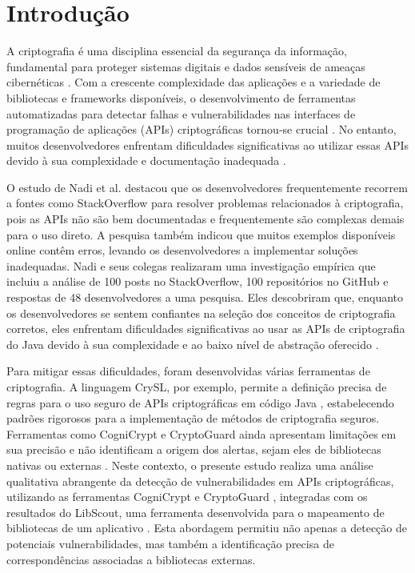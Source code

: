 \section{Introdução}

A criptografia é uma disciplina essencial da segurança da informação, fundamental para proteger sistemas digitais e dados sensíveis de ameaças cibernéticas \cite{what_is_cryptography}. Com a crescente complexidade das aplicações e a variedade de bibliotecas e frameworks disponíveis, o desenvolvimento de ferramentas automatizadas para detectar falhas e vulnerabilidades nas interfaces de programação de aplicações (APIs) criptográficas tornou-se crucial \cite{api_misuses_zhang}. No entanto, muitos desenvolvedores enfrentam dificuldades significativas ao utilizar essas APIs devido à sua complexidade e documentação inadequada \cite{nadi_icse_2016}.

O estudo de Nadi et al. \cite{nadi_icse_2016} destacou que os desenvolvedores frequentemente recorrem a fontes como StackOverflow para resolver problemas relacionados à criptografia, pois as APIs não são bem documentadas e frequentemente são complexas demais para o uso direto. A pesquisa também indicou que muitos exemplos disponíveis online contêm erros, levando os desenvolvedores a implementar soluções inadequadas. Nadi e seus colegas realizaram uma investigação empírica que incluiu a análise de 100 posts no StackOverflow, 100 repositórios no GitHub e respostas de 48 desenvolvedores a uma pesquisa. Eles descobriram que, enquanto os desenvolvedores se sentem confiantes na seleção dos conceitos de criptografia corretos, eles enfrentam dificuldades significativas ao usar as APIs de criptografia do Java devido à sua complexidade e ao baixo nível de abstração oferecido \cite{nadi_icse_2016}.

Para mitigar essas dificuldades, foram desenvolvidas várias ferramentas de criptografia. A linguagem CrySL, por exemplo, permite a definição precisa de regras para o uso seguro de APIs criptográficas em código Java \cite{CogniCrypt}, estabelecendo padrões rigorosos para a implementação de métodos de criptografia seguros. Ferramentas como CogniCrypt e CryptoGuard ainda apresentam limitações em sua precisão e não identificam a origem dos alertas, sejam eles de bibliotecas nativas ou externas \cite{perception_developers}. Neste contexto, o presente estudo realiza uma análise qualitativa abrangente da detecção de vulnerabilidades em APIs criptográficas, utilizando as ferramentas CogniCrypt \cite{CogniCrypt} e CryptoGuard \cite{CryptoGuard}, integradas com os resultados do LibScout, uma ferramenta desenvolvida para o mapeamento de bibliotecas de um aplicativo \cite{LibScout}. Esta abordagem permitiu não apenas a detecção de potenciais vulnerabilidades, mas também a identificação precisa de correspondências associadas a bibliotecas externas.

